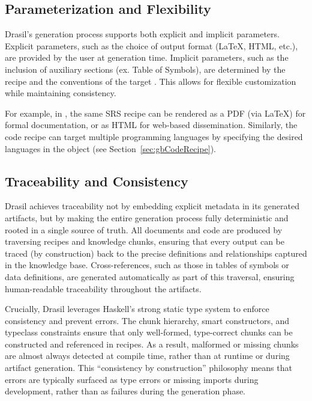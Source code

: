 \subsection{Parameterization and Flexibility}

Drasil's generation process supports both explicit and implicit parameters. 
Explicit parameters, such as the choice of output format (\LaTeX{}, HTML, 
etc.), are provided by the user at generation time. Implicit parameters, such 
as the inclusion of auxiliary sections (ex. Table of Symbols), are determined 
by the recipe and the conventions of the target \sf{}. This allows for 
flexible customization while maintaining consistency.

For example, in \gb{}, the same SRS recipe can be rendered as a PDF (via 
\LaTeX{}) for formal documentation, or as HTML for web-based dissemination. 
Similarly, the code recipe can target multiple programming languages by 
specifying the desired languages in the  object (see 
Section~\ref{sec:gbCodeRecipe}).

\subsection{Traceability and Consistency}

Drasil achieves traceability not by embedding explicit metadata in its 
generated artifacts, but by making the entire generation process fully 
deterministic  and rooted in a single source 
of truth. All documents and code 
are produced by traversing recipes and knowledge chunks, ensuring that every 
output can be traced (by construction) back to the precise definitions and 
relationships captured in the knowledge base. Cross-references, such as those 
in tables of symbols or data definitions, are generated automatically as part 
of this traversal, ensuring human-readable traceability throughout the 
artifacts.

Crucially, Drasil leverages Haskell's strong static type system to enforce 
consistency and prevent errors. The chunk hierarchy, smart constructors, and 
typeclass constraints ensure that only well-formed, type-correct chunks can be 
constructed and referenced in recipes. As a result, malformed or missing chunks 
are almost always detected at compile time, rather than at runtime or during 
artifact generation. This “consistency by construction” philosophy means that 
errors are typically surfaced as type errors or missing imports during 
development, rather than as failures during the generation phase.

